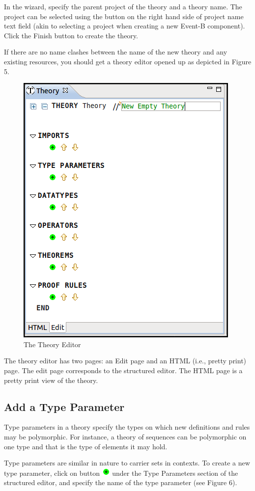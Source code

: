 \par
In the wizard, specify the parent project of the theory and a theory name. The project can be selected using the button on the right hand side of project name text field (akin to selecting a project when creating a new Event-B component). Click the Finish button to create the theory.
\par 
If there are no name clashes between the name of the new theory and any existing resources, you should get a theory editor opened up as depicted in Figure 5.
\begin{center}
\begin{figure}
\label{theoryEditor}
\includegraphics{images/TheoryEditor.png}
\caption{The Theory Editor}
\end{figure}
\end{center}

\par 
The theory editor has two pages: an Edit page and an HTML (i.e., pretty print) page. The edit page corresponds to the structured editor. The HTML page is a pretty print view of the theory.

\subsection{Add a Type Parameter}
Type parameters in a theory specify the types on which new definitions and rules may be polymorphic. For instance, a theory of sequences can be polymorphic on one type and that is the type of elements it may hold.
\par 
Type parameters are similar in nature to carrier sets in contexts. To create a new type parameter, click on button \includegraphics{images/add.png} under the Type Parameters section of the structured editor, and specify the name of the type parameter (see Figure 6).

